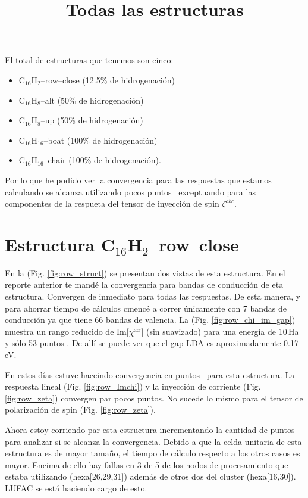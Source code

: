 \documentclass[11pt]{article}
\title{Todas las estructuras}
\date{}
\begin{document}
\maketitle
\thispagestyle{empty}


\vspace{.5cm}

El total de estructuras que tenemos son cinco: 

\begin{itemize}
\item C$_{16}$H$_{2}$--row--close (12.5\% de hidrogenaci\'on)
\item C$_{16}$H$_{8}$--alt (50\% de hidrogenaci\'on)
\item C$_{16}$H$_{8}$--up (50\% de hidrogenaci\'on)
\item C$_{16}$H$_{16}$--boat (100\% de hidrogenaci\'on)
\item C$_{16}$H$_{16}$--chair (100\% de hidrogenaci\'on). 
\end{itemize}

Por lo que he podido ver la convergencia para las respuestas que estamos calculando se alcanza utilizando pocos puntos \vk \ exceptuando para las componentes de la respueta del tensor de inyecci\'on de spin $\zeta^{abc}$.


\section{Estructura C$_{16}$H$_{2}$--row--close}\label{section:row}

En la (Fig. \ref{fig:row_struct}) se presentan dos vistas de esta estructura. En el reporte anterior te mand\'e la convergencia para bandas de conducci\'on de eta estructura. Convergen de inmediato para todas las respuestas. De esta manera, y para ahorrar tiempo de c\'alculos cmenc\'e a correr \'unicamente con 7 bandas de conducci\'on ya que tiene 66 bandas de valencia. La (Fig. \ref{fig:row_chi_im_gap}) muestra un rango reducido de Im[$\chi^{xx}$] (sin suavizado) para una energ\'ia de 10\,Ha y s\'olo 53 puntos \vk. De all\'i se puede ver que el gap LDA es aproximadamente 0.17\,eV.


En estos d\'ias estuve haceindo convergencia en puntos \vk \ para esta estructura. La respuesta lineal (Fig. \ref{fig:row_Imchi}) y la inyecci\'on de corriente (Fig. \ref{fig:row_zeta}) convergen par pocos puntos. No sucede lo mismo para el tensor de polarizaci\'on de spin (Fig. \ref{fig:row_zeta}).

Ahora estoy corriendo par esta estructura incrementando la cantidad de puntos para analizar si se alcanza la convergencia. Debido a que la celda unitaria de esta estructura es de mayor tama\~no, el tiempo de c\'alculo respecto a los otros casos es mayor. Encima de ello hay fallas en 3 de 5 de los nodos de procesamiento que estaba utilizando (hexa[26,29,31]) adem\'as de otros dos del cluster (hexa[16,30]). LUFAC se est\'a haciendo cargo de esto.
\end{document}

